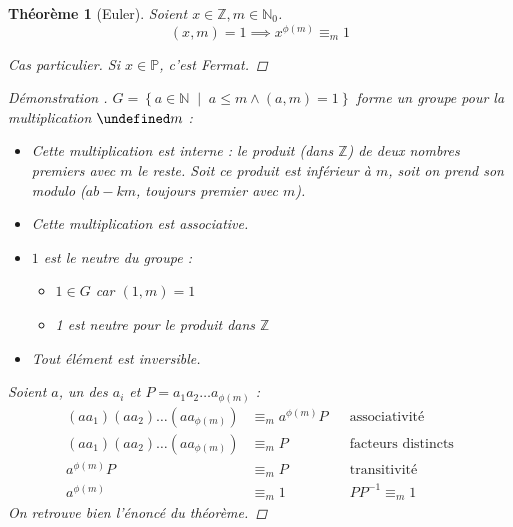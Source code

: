 \documentclass[11pt,twocolumn]{article}
\let\mod\undefined
\DeclareMathOperator{\mod}{mod}
\theoremstyle{plain}
\newtheorem{thm}{Théorème}
\newcommand{\esP}{\mathbb{P}} %
\newcommand{\esN}{\mathbb{N}} %
\newcommand{\esZ}{\mathbb{Z}} %
\newenvironment{cproof}[1]{\begin{proof}[Démonstration \cite{#1}]}{\end{proof}}
\begin{document}
\begin{thm}[Euler]
	Soient $x \in \esZ, m \in \esN_0$. \[
		(x,m) = 1 \implies x^{\phi(m)} \equiv_m 1
	\]
	\begin{proof}[Cas particulier]
		Si $x \in \esP$, c'est Fermat.
	\end{proof}
	\begin{cproof}{Buys}
		$G=\left\{a\in\esN \; \middle| \; a \leq m \land (a,m)=1\right\}$
		forme un groupe pour la multiplication $\mod m$ :
		\begin{itemize}
			\item Cette multiplication est interne : le produit (dans $\esZ$)
				de deux nombres premiers avec $m$ le reste.
				Soit ce produit est inférieur à $m$,
				soit on prend son modulo ($ab-km$, toujours premier avec $m$).
			\item Cette multiplication est associative.
			\item $1$ est le neutre du groupe :
				\begin{itemize}
					\item $1\in G$ car $(1,m)=1$
					\item 1 est neutre pour le produit dans $\esZ$
				\end{itemize}
			\item Tout élément est inversible.
		\end{itemize}
		Soient $a$, un des $a_i$ et $P=a_1a_2\dots a_{\phi(m)}$ :
		\begin{align*}
			\left(aa_1\right)\left(aa_2\right)\dots\left(aa_{\phi(m)}\right)
			&\equiv_m a^{\phi(m)}P && \text{associativité} \\
			\left(aa_1\right)\left(aa_2\right)\dots\left(aa_{\phi(m)}\right)
			&\equiv_m P && \text{facteurs distincts} \\
			a^{\phi(m)}P &\equiv_m P && \text{transitivité} \\
			a^{\phi(m)} &\equiv_m 1 && PP^{-1}\equiv_m1
		\end{align*}
		On retrouve bien l'énoncé du théorème.
	\end{cproof}
\end{thm}
\end{document}
